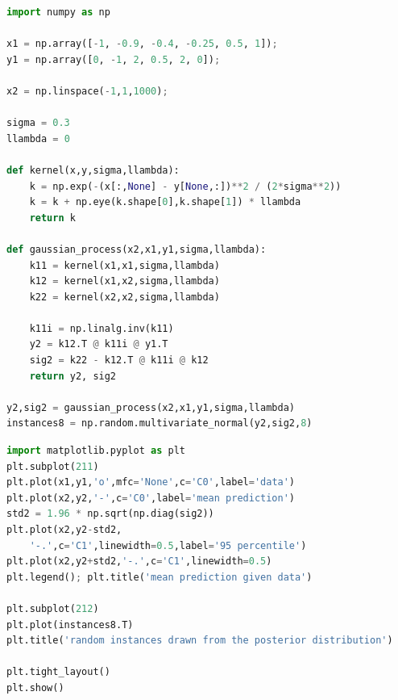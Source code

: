\documentclass{article}
\begin{document}
\begin{lstlisting}[language=Python, caption=python implementation of a gaussian process]
import numpy as np

x1 = np.array([-1, -0.9, -0.4, -0.25, 0.5, 1]);
y1 = np.array([0, -1, 2, 0.5, 2, 0]);

x2 = np.linspace(-1,1,1000);

sigma = 0.3
llambda = 0

def kernel(x,y,sigma,llambda):
    k = np.exp(-(x[:,None] - y[None,:])**2 / (2*sigma**2))
    k = k + np.eye(k.shape[0],k.shape[1]) * llambda
    return k

def gaussian_process(x2,x1,y1,sigma,llambda):
    k11 = kernel(x1,x1,sigma,llambda)
    k12 = kernel(x1,x2,sigma,llambda)
    k22 = kernel(x2,x2,sigma,llambda)

    k11i = np.linalg.inv(k11)
    y2 = k12.T @ k11i @ y1.T
    sig2 = k22 - k12.T @ k11i @ k12
    return y2, sig2

y2,sig2 = gaussian_process(x2,x1,y1,sigma,llambda)
instances8 = np.random.multivariate_normal(y2,sig2,8)
\end{lstlisting}

\begin{lstlisting}[language=Python, caption=python plotting results]
import matplotlib.pyplot as plt
plt.subplot(211)
plt.plot(x1,y1,'o',mfc='None',c='C0',label='data')
plt.plot(x2,y2,'-',c='C0',label='mean prediction')
std2 = 1.96 * np.sqrt(np.diag(sig2))
plt.plot(x2,y2-std2,
	'-.',c='C1',linewidth=0.5,label='95 percentile')
plt.plot(x2,y2+std2,'-.',c='C1',linewidth=0.5)
plt.legend(); plt.title('mean prediction given data')

plt.subplot(212)
plt.plot(instances8.T)
plt.title('random instances drawn from the posterior distribution')

plt.tight_layout()
plt.show()

\end{lstlisting}

\nocite{*}


\end{document}
